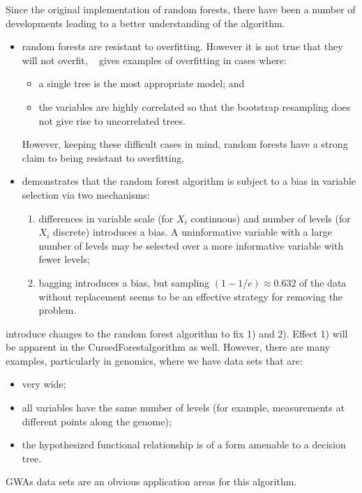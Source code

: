 \documentclass[10pt,letterpaper]{article}
\newcommand{\cursedforest}{{\sc CursedForest}}
\begin{document}
Since the original implementation of random forests, there have been a number of developments leading to a better
understanding of the algorithm.
\begin{itemize}
\item random forests are resistant to overfitting. However it is not true that they will not overfit,
  ~\cite{Segal.2004} gives examples of overfitting in cases where:
  \begin{itemize}
  \item a single tree is the most appropriate model; and
  \item the variables are highly correlated so that the bootstrap resampling does not give rise to uncorrelated trees.
  \end{itemize}
However, keeping these difficult cases in mind, random forests have a strong claim to being resistant to overfitting.
\item \cite{Strobl.et.al.2007} demonstrates that the random forest algorithm is subject to a bias in variable selection
  via two mechanisms:
  \begin{enumerate}
  \item differences in variable scale (for $X_i$ continuous) and number of levels (for $X_i$ discrete) introduces a
    bias. A uninformative variable with a large number of levels may be selected over a more informative variable with
    fewer levels;
  \item bagging introduces a bias, but sampling $(1- 1/e) \approx 0.632$ of the data without replacement seems to be an
    effective strategy for removing the problem.
  \end{enumerate}
\end{itemize} 

\cite{Strobl.et.al.2007} introduce changes to the random forest algorithm to fix 1) and 2).  Effect 1) will be apparent
in the \cursedforest algorithm as well.  However, there are many examples, particularly in genomics, where we have data
sets that are:
\begin{itemize}
\item very wide;
\item all variables have the same number of levels (for example, measurements at different points along the genome);
\item the hypothesized functional relationship is of a form amenable to a decision tree.
\end{itemize}
GWAs data sets are an obvious application areas for this algorithm. 
\end{document}
